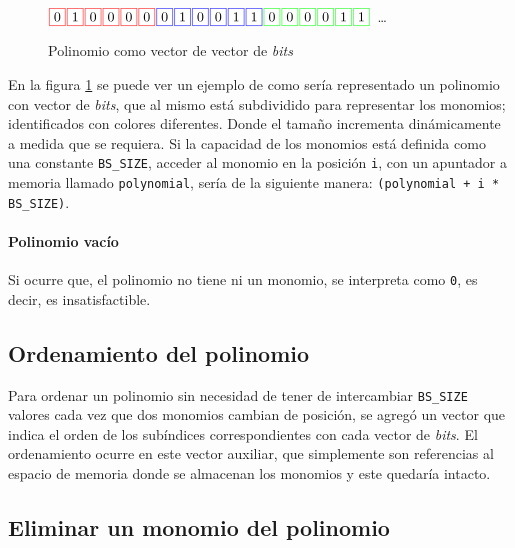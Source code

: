 \begin{figure}
    \centering\noindent
    $\fcolorbox{red}{white}{0} \sep \fcolorbox{red}{white}{1} \sep \fcolorbox{red}{white}{0} \sep \fcolorbox{red}{white}{0} \sep \fcolorbox{red}{white}{0} \sep \fcolorbox{red}{white}{0} \sep \fcolorbox{blue}{white}{0} \sep \fcolorbox{blue}{white}{1} \sep \fcolorbox{blue}{white}{0} \sep \fcolorbox{blue}{white}{0} \sep \fcolorbox{blue}{white}{1} \sep \fcolorbox{blue}{white}{1} \sep \fcolorbox{green}{white}{0} \sep \fcolorbox{green}{white}{0} \sep \fcolorbox{green}{white}{0} \sep \fcolorbox{green}{white}{0} \sep \fcolorbox{green}{white}{1} \sep \fcolorbox{green}{white}{1}$\ \dots\ \\
\caption{Polinomio como vector de vector de \textit{bits}}
\label{fig:pbs}
\end{figure}

En la figura \ref{fig:pbs} se puede ver un ejemplo de como sería representado un polinomio con vector de \textit{bits}, que al mismo está subdividido para representar los monomios; identificados con colores diferentes. Donde el tamaño incrementa dinámicamente a medida que se requiera. Si la capacidad de los monomios está definida como una constante \texttt{BS\_SIZE}, acceder al monomio en la posición \texttt{i}, con un apuntador a memoria llamado \texttt{polynomial}, sería de la siguiente manera: \texttt{(polynomial + i * BS\_SIZE)}.

\paragraph{Polinomio vacío} Si ocurre que, el polinomio no tiene ni un monomio, se interpreta como \texttt{0}, es decir, es insatisfactible.

\subsection{Ordenamiento del polinomio}

Para ordenar un polinomio sin necesidad de tener de intercambiar \texttt{BS\_SIZE} valores cada vez que dos monomios cambian de posición, se agregó un vector que indica el orden de los subíndices correspondientes con cada vector de \textit{bits}. El ordenamiento ocurre en este vector auxiliar, que simplemente son referencias al espacio de memoria donde se almacenan los monomios y este quedaría intacto.

\subsection{Eliminar un monomio del polinomio}

